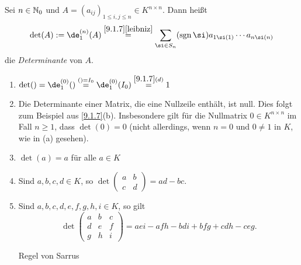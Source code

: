 \documentclass[../../main.tex]{subfiles}
\begin{document}
\begin{df}\label{9.1.9}
Sei $n\in\mathbb N_0$ und $A=(a_{ij})_{1\le i,j\le n}\in K^{n\times n}$. Dann heißt \[\det(A):=\de_1^{(n)}(A)\overset{\ref{9.1.7}\eqref{leibniz}}=\sum_{\si\in S_n}(\sgn\si)
a_{1\si(1)}\dotsm a_{n\si(n)}\] die \emph{Determinante} von $A$.
\end{df}

\begin{bsp}\label{9.1.10}
\begin{enumerate}[\normalfont(a)]
\item $\det()=\de_1^{(0)}()\overset{()=I_0}=\de_1^{(0)}(I_0)\overset{\ref{9.1.7}(d)}=1$
\item Die Determinante einer Matrix, die eine Nullzeile enthält, ist null. Dies folgt zum Beispiel aus \ref{9.1.7}(b). Insbesondere gilt für die Nullmatrix
$0\in K^{n\times n}$ im Fall $n\ge1$, dass $\det(0)=0$ (nicht allerdings, wenn $n=0$ und $0\ne1$ in $K$, wie in (a) gesehen).
\item $\det(a)=a$ für alle $a\in K$
\item Sind $a,b,c,d\in K$, so $\det\begin{pmatrix}a&b\\c&d\end{pmatrix}=ad-bc$.
\item Sind $a,b,c,d,e,f,g,h,i\in K$, so gilt
\[\det\begin{pmatrix}a&b&c\\d&e&f\\g&h&i\end{pmatrix}=aei-afh-bdi+bfg+cdh-ceg.\]
\begin{center}
Regel von Sarrus
\end{center}
\end{enumerate}
\end{bsp}
\end{document}
